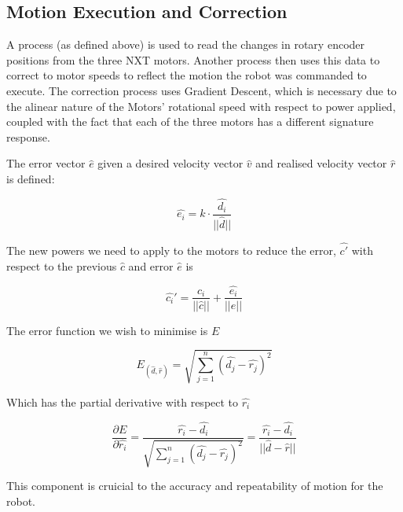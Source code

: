 \subsection{Motion Execution and Correction}

A process (as defined above) is used to read the changes in rotary encoder positions from the three NXT motors. Another process then uses this data to correct to motor speeds to reflect the motion the robot was commanded to execute. The correction process uses Gradient Descent, which is necessary due to the alinear nature of the Motors' rotational speed with respect to power applied, coupled with the fact that each of the three motors has a different signature response.

The error vector $\hat{e}$ given a desired velocity vector $\hat{v}$ and realised velocity vector $\hat{r}$ is defined:

\begin{equation}
  \hat{e_i} = k \cdot \frac{\hat{d_i}}{||\hat{d}||}
\end{equation}

The new powers we need to apply to the motors to reduce the error, $\hat{c'}$ with respect to the previous $\hat{c}$ and error $\hat{e}$ is

\begin{equation}
  \hat{c_i}' = \frac{ \hat{c_i} }{||\hat{c}||} + \frac{ \hat{e_i} }{||\hat{e}||}
\end{equation}

The error function we wish to minimise is $E$

\begin{equation}
  E_{(\hat{d},\hat{r})} = \sqrt{\sum_{j=1}^{n} (\hat{d_j} - \hat{r_j})^2}
\end{equation}

Which has the partial derivative with respect to $\hat{r_i}$

\begin{equation}
  \frac{\partial E}{\partial \hat{r_i}}
  =
  \frac{\hat{r_i} - \hat{d_i}}{\sqrt{\sum_{j=1}^{n} (\hat{d_j} - \hat{r_j})^2}}
  =
  \frac{\hat{r_i} - \hat{d_i}}{||\hat{d}-\hat{r}||}
\end{equation}

This component is cruicial to the accuracy and repeatability of motion for the robot.

